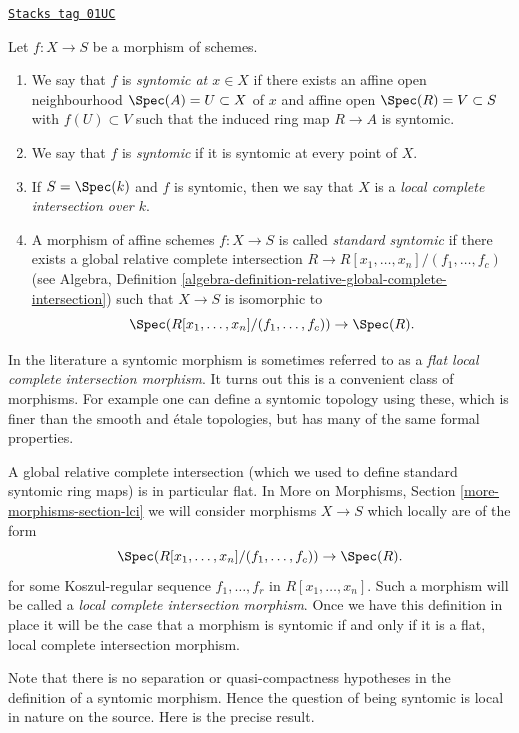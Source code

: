 \begin{definition}[Syntomic]
\label{morphisms-definition-syntomic}
\href{https://stacks.math.columbia.edu/tag/01UC}{\texttt{Stacks tag 01UC}}

Let $f : X \to S$ be a morphism of schemes.
\begin{enumerate}
\item We say that $f$ is {\it syntomic at $x \in X$} if
there exists an affine open neighbourhood $\Spec(A) = U \subset X$
of $x$ and affine open $\Spec(R) = V \subset S$
with $f(U) \subset V$ such that the induced ring map
$R \to A$ is syntomic.
\item We say that $f$ is {\it syntomic} if it is syntomic
at every point of $X$.
\item If $S = \Spec(k)$ and $f$ is syntomic, then we say that
$X$ is a {\it local complete intersection over $k$}.
\item A morphism of affine schemes $f : X \to S$
is called {\it standard syntomic} if there exists a
global relative complete intersection
$R \to R[x_1, \ldots, x_n]/(f_1, \ldots, f_c)$ (see
Algebra,
Definition \ref{algebra-definition-relative-global-complete-intersection})
such that $X \to S$ is isomorphic to
$$
\Spec(R[x_1, \ldots, x_n]/(f_1, \ldots, f_c)) \to \Spec(R).
$$
\end{enumerate}
\end{definition}

In the literature a syntomic morphism is sometimes referred to as a
{\it flat local complete intersection morphism}.
It turns out this is a convenient class of morphisms. For example one
can define a syntomic topology using these, which is finer than the
smooth and \'etale topologies, but has many of the same formal properties.

\medskip\noindent
A global relative complete intersection (which we used to define standard
syntomic ring maps) is in particular flat. In
More on Morphisms, Section \ref{more-morphisms-section-lci}
we will consider morphisms $X \to S$ which locally are of the form
$$
\Spec(R[x_1, \ldots, x_n]/(f_1, \ldots, f_c)) \to \Spec(R).
$$
for some Koszul-regular sequence $f_1, \ldots, f_r$ in $R[x_1, \ldots, x_n]$.
Such a morphism will be called a {\it local complete intersection morphism}.
Once we have this definition in place it will be the case that a morphism
is syntomic if and only if it is a flat, local complete intersection morphism.

\medskip\noindent
Note that there is no separation or quasi-compactness hypotheses in the
definition of a syntomic morphism. Hence the question of being syntomic
is local in nature on the source. Here is the precise result.

